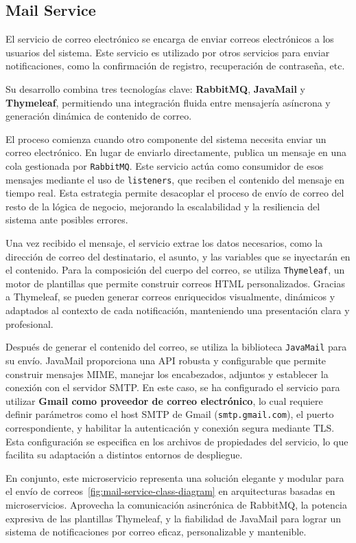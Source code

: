 \subsection{Mail Service}
El servicio de correo electrónico se encarga de enviar correos electrónicos a los usuarios del sistema. Este servicio es utilizado por otros servicios para enviar notificaciones, como la confirmación de registro, recuperación de contraseña, etc.

Su desarrollo combina tres tecnologías clave: \textbf{RabbitMQ}, \textbf{JavaMail} y \textbf{Thymeleaf}, permitiendo una integración fluida entre mensajería asíncrona y generación dinámica de contenido de correo.

El proceso comienza cuando otro componente del sistema necesita enviar un correo electrónico. En lugar de enviarlo directamente, publica un mensaje en una cola gestionada por \texttt{RabbitMQ}. Este servicio actúa como consumidor de esos mensajes mediante el uso de \texttt{listeners}, que reciben el contenido del mensaje en tiempo real. Esta estrategia permite desacoplar el proceso de envío de correo del resto de la lógica de negocio, mejorando la escalabilidad y la resiliencia del sistema ante posibles errores.

Una vez recibido el mensaje, el servicio extrae los datos necesarios, como la dirección de correo del destinatario, el asunto, y las variables que se inyectarán en el contenido. Para la composición del cuerpo del correo, se utiliza \texttt{Thymeleaf}, un motor de plantillas que permite construir correos HTML personalizados. Gracias a Thymeleaf, se pueden generar correos enriquecidos visualmente, dinámicos y adaptados al contexto de cada notificación, manteniendo una presentación clara y profesional.

Después de generar el contenido del correo, se utiliza la biblioteca \texttt{JavaMail} para su envío. JavaMail proporciona una API robusta y configurable que permite construir mensajes MIME, manejar los encabezados, adjuntos y establecer la conexión con el servidor SMTP. En este caso, se ha configurado el servicio para utilizar \textbf{Gmail como proveedor de correo electrónico}, lo cual requiere definir parámetros como el host SMTP de Gmail (\texttt{smtp.gmail.com}), el puerto correspondiente, y habilitar la autenticación y conexión segura mediante TLS. Esta configuración se especifica en los archivos de propiedades del servicio, lo que facilita su adaptación a distintos entornos de despliegue.

En conjunto, este microservicio representa una solución elegante y modular para el envío de correos~\ref{fig:mail-service-class-diagram} en arquitecturas basadas en microservicios. Aprovecha la comunicación asincrónica de RabbitMQ, la potencia expresiva de las plantillas Thymeleaf, y la fiabilidad de JavaMail para lograr un sistema de notificaciones por correo eficaz, personalizable y mantenible.

